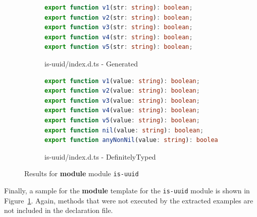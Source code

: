 \documentclass[a4paper,english,cleveref, autoref]{lipics-v2019}
\newcommand{\figref}[1]{Figure~\ref{#1}}
\begin{document}
\begin{figure}[tp]
    \centering
    \begin{subfigure}{0.48\linewidth}
      \begin{lstlisting}[language=TypeScript]
export function v1(str: string): boolean;
export function v2(str: string): boolean;
export function v3(str: string): boolean;
export function v4(str: string): boolean;
export function v5(str: string): boolean;
      \end{lstlisting}
      \caption{is-uuid/index.d.ts - Generated}
    \end{subfigure}
    \hfill
    \begin{subfigure}{0.48\linewidth}
      \begin{lstlisting}[language=TypeScript]
export function v1(value: string): boolean;
export function v2(value: string): boolean;
export function v3(value: string): boolean;
export function v4(value: string): boolean;
export function v5(value: string): boolean;
export function nil(value: string): boolean;
export function anyNonNil(value: string): boolean;
      \end{lstlisting}
      \caption{is-uuid/index.d.ts - DefinitelyTyped}
    \end{subfigure}

    \caption{Results for \textbf{module}  module \texttt{is-uuid}}
    \label{fig:experiments-results-module-is-uuid}
\end{figure}

Finally, a sample for the \textbf{module} template
for the \texttt{is-uuid} module is shown in
\figref{fig:experiments-results-module-is-uuid}.
Again, methods that were not executed by the extracted examples are
not included in the declaration file. 
\end{document}

